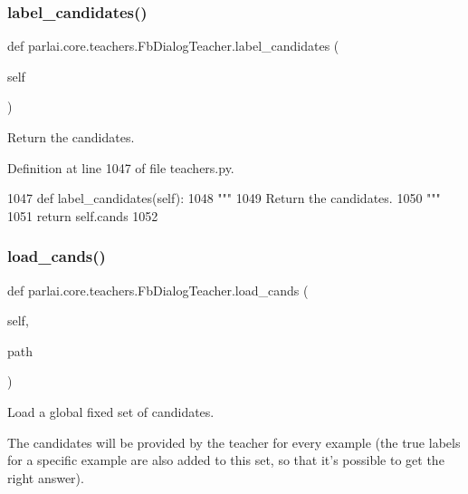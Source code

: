 \subsubsection{\texorpdfstring{label\+\_\+candidates()}{label\_candidates()}}
{\footnotesize\ttfamily def parlai.\+core.\+teachers.\+Fb\+Dialog\+Teacher.\+label\+\_\+candidates (\begin{DoxyParamCaption}\item[{}]{self }\end{DoxyParamCaption})}

\begin{DoxyVerb}Return the candidates.
\end{DoxyVerb}
 

Definition at line 1047 of file teachers.\+py.


\begin{DoxyCode}
1047     \textcolor{keyword}{def }label\_candidates(self):
1048         \textcolor{stringliteral}{"""}
1049 \textcolor{stringliteral}{        Return the candidates.}
1050 \textcolor{stringliteral}{        """}
1051         \textcolor{keywordflow}{return} self.cands
1052 
\end{DoxyCode}
\mbox{\label{classparlai_1_1core_1_1teachers_1_1FbDialogTeacher_ae6f10486ddf691ee868d33ea2c9dc295}} 
\subsubsection{\texorpdfstring{load\+\_\+cands()}{load\_cands()}}
{\footnotesize\ttfamily def parlai.\+core.\+teachers.\+Fb\+Dialog\+Teacher.\+load\+\_\+cands (\begin{DoxyParamCaption}\item[{}]{self,  }\item[{}]{path }\end{DoxyParamCaption})}

\begin{DoxyVerb}Load a global fixed set of candidates.

The candidates will be provided by the teacher for every example (the true
labels for a specific example are also added to this set, so that it's possible
to get the right answer).
\end{DoxyVerb}
 

